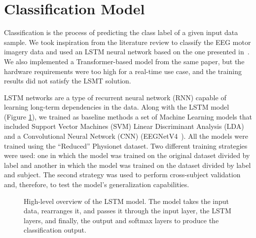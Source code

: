 \section{Classification Model}
Classification is the process of predicting the class label of a given input data sample.
We took inspiration from the literature review to classify the EEG motor imagery data and used an LSTM neural network based on the one presented in~\cite{sharma_deep_2023}.
We also implemented a Transformer-based model from the same paper, but the hardware requirements were too high for a real-time use case, and the training results did not satisfy the LSMT solution.

LSTM networks are a type of recurrent neural network (RNN) capable of learning long-term dependencies in the data.
Along with the LSTM model (Figure \ref{fig:lstm}), we trained as baseline methods a set of Machine Learning models that included Support Vector Machines (SVM) Linear Discriminant Analysis (LDA) and a Convolutional Neural Network (CNN) (EEGNetV4~\cite{lawhern2018eegnet}).
All the models were trained using the ``Reduced'' Physionet dataset. 
Two different training strategies were used: one in which the model was trained on the original dataset divided by label and another in which the model was trained on the dataset divided by label and subject.
The second strategy was used to perform cross-subject validation and, therefore, to test the model's generalization capabilities.

\begin{figure}[!htbp]
    \centering
    \caption{High-level overview of the LSTM model.
    The model takes the input data, rearranges it, and passes it through the input layer, the LSTM layers, and finally, the output and softmax layers to produce the classification output.}\label{fig:lstm}
\end{figure}


